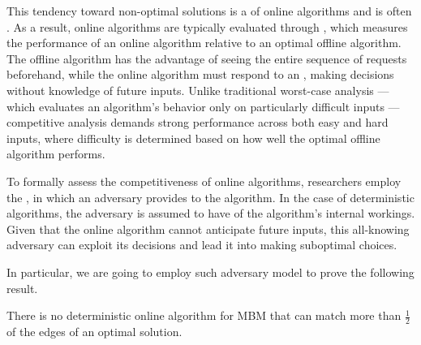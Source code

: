 \documentclass[a4paper, 12pt]{report}
\begin{document}
    This tendency toward non-optimal solutions is a  of online algorithms and is often . As a result, online algorithms are typically evaluated through , which measures the performance of an online algorithm relative to an optimal offline algorithm. The offline algorithm has the advantage of seeing the entire sequence of requests beforehand, while the online algorithm must respond to an , making decisions without knowledge of future inputs. Unlike traditional worst-case analysis --- which evaluates an algorithm's behavior only on particularly difficult inputs --- competitive analysis demands strong performance across both easy and hard inputs, where difficulty is determined based on how well the optimal offline algorithm performs.

    To formally assess the competitiveness of online algorithms, researchers employ the , in which an adversary provides  to the algorithm. In the case of deterministic algorithms, the adversary is assumed to have  of the algorithm's internal workings. Given that the online algorithm cannot anticipate future inputs, this all-knowing adversary can exploit its decisions and lead it into making suboptimal choices.

    In particular, we are going to employ such adversary model to prove the following result.

    \begin{framedthm}[label={mbm det}]{}
        There is no deterministic online algorithm for MBM that can match more than $\tfrac{1}{2}$ of the edges of an optimal solution.
    \end{framedthm}
\end{document}
